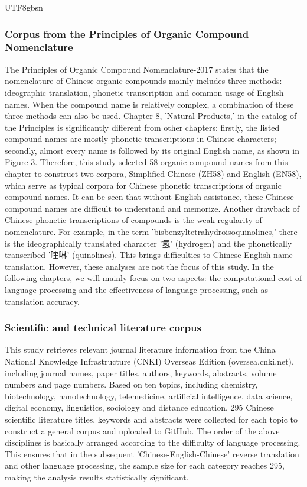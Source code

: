 \documentclass[conference]{IEEEtran}
\begin{document}
\begin{CJK*}{UTF8}{gbsn}
\subsubsection{Corpus from the Principles of Organic Compound Nomenclature}
The Principles of Organic Compound Nomenclature-2017 states that the nomenclature of Chinese organic compounds mainly includes three methods: ideographic translation, phonetic transcription and common usage of English names. When the compound name is relatively complex, a combination of these three methods can also be used. Chapter 8, 'Natural Products,' in the catalog of the Principles is significantly different from other chapters: firstly, the listed compound names are mostly phonetic transcriptions in Chinese characters; secondly, almost every name is followed by its original English name, as shown in Figure 3. Therefore, this study selected 58 organic compound names from this chapter to construct two corpora, Simplified Chinese (ZH58) and English (EN58), which serve as typical corpora for Chinese phonetic transcriptions of organic compound names. It can be seen that without English assistance, these Chinese compound names are difficult to understand and memorize. Another drawback of Chinese phonetic transcriptions of compounds is the weak regularity of nomenclature. For example, in the term 'bisbenzyltetrahydroisoquinolines,' there is the ideographically translated character '氢' (hydrogen) and the phonetically transcribed '喹啉' (quinolines). This brings difficulties to Chinese-English name translation. However, these analyses are not the focus of this study. In the following chapters, we will mainly focus on two aspects: the computational cost of language processing and the effectiveness of language processing, such as translation accuracy.

\subsubsection{Scientific and technical literature corpus}

This study retrieves relevant journal literature information from the China National Knowledge Infrastructure (CNKI) Overseas Edition (oversea.cnki.net), including journal names, paper titles, authors, keywords, abstracts, volume numbers and page numbers. Based on ten topics, including chemistry, biotechnology, nanotechnology, telemedicine, artificial intelligence, data science, digital economy, linguistics, sociology and distance education, 295 Chinese scientific literature titles, keywords and abstracts were collected for each topic to construct a general corpus and uploaded to GitHub. The order of the above disciplines is basically arranged according to the difficulty of language processing. This ensures that in the subsequent 'Chinese-English-Chinese' reverse translation and other language processing, the sample size for each category reaches 295, making the analysis results statistically significant.


\end{CJK*}
\end{document}
